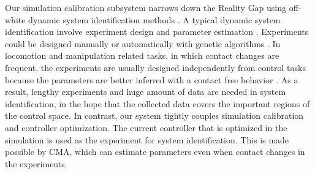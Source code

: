 Our simulation calibration subsystem narrows down the Reality Gap using off-white dynamic system identification methods \cite{ljung:2010}. A typical dynamic system identification involve experiment design and parameter estimation \cite{swevers:2007}. Experiments could be designed manually or automatically with genetic algorithms \cite{BongardL05}. In locomotion and manipulation related tasks, in which contact changes are frequent, the experiments are usually designed independently from control tasks because the parameters are better inferred with a contact free behavior \cite{Kolev:2015}. As a result, lengthy experiments and huge amount of data are needed in system identification, in the hope that the collected data covers the important regions of the control space. In contrast, our system tightly couples simulation calibration and controller optimization. The current controller that is optimized in the simulation is used as the experiment for system identification. This is made possible by CMA, which can estimate parameters even when contact changes in the experiments. 

